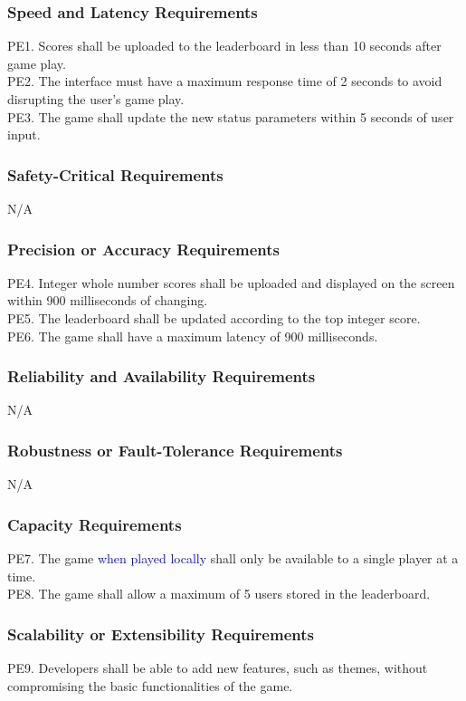 \documentclass[12pt]{article}
\begin{document}
    \subsubsection{Speed and Latency Requirements}
    PE1. Scores shall be uploaded to the leaderboard in less than 10 seconds after game play.\\
    PE2. The interface must have a maximum response time of 2 seconds to avoid disrupting the user's game play.\\
    PE3. The game shall update the new status parameters within 5 seconds of user input.

    \subsubsection{Safety-Critical Requirements}
    N/A
    
    \subsubsection{Precision or Accuracy Requirements}
    PE4. Integer whole number scores shall be uploaded and displayed on the screen within 900 milliseconds of changing.\\
    PE5. The leaderboard shall be updated according to the top integer score.\\
    PE6. The game shall have a maximum latency of 900 milliseconds.
    
    \subsubsection{Reliability and Availability Requirements}
    N/A

    \subsubsection{Robustness or Fault-Tolerance Requirements}
    N/A
    
    \subsubsection{Capacity Requirements}
    PE7. The game \textcolor{blue}{when played locally} shall only be available to a single player at a time.\\
    PE8. The game shall allow a maximum of 5 users stored in the leaderboard.
    
    \subsubsection{Scalability or Extensibility Requirements}
    PE9. Developers shall be able to add new features, such as themes, without compromising the basic functionalities of the game. 
    
\end{document}
